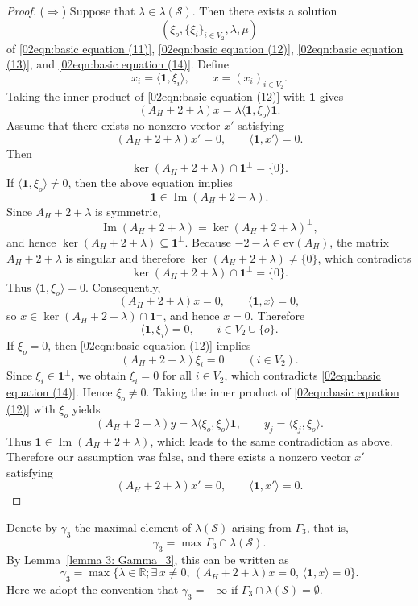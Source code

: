 \documentclass[pdflatex,sn-mathphys-num]{sn-jnl}
\theoremstyle{thmstyleone}%
\theoremstyle{thmstyletwo}%
\theoremstyle{thmstylethree}%
\begin{document}
\begin{proof}
\medskip
\noindent
($\Rightarrow$)
Suppose that $\lambda\in\lambda(\mathcal S)$. Then there exists a solution
\[
(\xi_o,\{\xi_i\}_{i\in V_2},\lambda,\mu)
\]
of \eqref{02eqn:basic equation (11)}, \eqref{02eqn:basic equation (12)}, \eqref{02eqn:basic equation (13)}, and \eqref{02eqn:basic equation (14)}.
Define
\[
x_i=\langle\mathbf{1},\xi_i\rangle,
\qquad
x=(x_i)_{i\in V_2}.
\]
Taking the inner product of \eqref{02eqn:basic equation (12)} with $\mathbf{1}$ gives
\[
(A_H+2+\lambda)x
=
\lambda\langle\mathbf{1},\xi_o\rangle\mathbf{1}.
\]
Assume that there exists no nonzero vector $x'$ satisfying
\[
(A_H+2+\lambda)x' =0,
\qquad
\langle\mathbf{1},x'\rangle=0.
\]
Then
\[
\ker(A_H+2+\lambda)\cap \mathbf{1}^\perp=\{0\}.
\]
If $\langle\mathbf{1},\xi_o\rangle\neq0$, then the above equation implies
\[
\mathbf{1}\in\operatorname{Im}(A_H+2+\lambda).
\]
Since $A_H+2+\lambda$ is symmetric,
\[
\operatorname{Im}(A_H+2+\lambda)
=
\ker(A_H+2+\lambda)^\perp,
\]
and hence $\ker(A_H+2+\lambda)\subseteq\mathbf{1}^\perp$. 
Because $-2-\lambda\in\mathrm{ev}(A_H)$, the matrix $A_H+2+\lambda$ is singular and therefore
$\ker(A_H+2+\lambda)\neq\{0\}$, which contradicts
\[
\ker(A_H+2+\lambda)\cap\mathbf{1}^\perp=\{0\}.
\]
Thus $\langle\mathbf{1},\xi_o\rangle=0$. Consequently,
\[
(A_H+2+\lambda)x=0,
\qquad
\langle\mathbf{1},x\rangle=0,
\]
so $x\in\ker(A_H+2+\lambda)\cap\mathbf{1}^\perp$, and hence $x=0$. Therefore
\[
\langle\mathbf{1},\xi_i\rangle=0,
\qquad i\in V_2\cup\{o\}.
\]
If $\xi_o=0$, then \eqref{02eqn:basic equation (12)} implies
\[
(A_H+2+\lambda)\xi_i=0
\qquad (i\in V_2).
\]
Since $\xi_i\in\mathbf{1}^\perp$, we obtain $\xi_i=0$ for all $i\in V_2$, which contradicts \eqref{02eqn:basic equation (14)}. 
Hence $\xi_o\neq0$. Taking the inner product of \eqref{02eqn:basic equation (12)} with $\xi_o$ yields
\[
(A_H+2+\lambda)y
=
\lambda\langle\xi_o,\xi_o\rangle\mathbf{1},
\qquad
y_j=\langle\xi_j,\xi_o\rangle .
\]
Thus $\mathbf{1}\in\operatorname{Im}(A_H+2+\lambda)$, which leads to the same contradiction as above. Therefore our assumption was false, and there exists a nonzero vector $x'$ satisfying
\[
(A_H+2+\lambda)x'=0,
\qquad
\langle\mathbf{1},x'\rangle=0.
\]
\end{proof}
Denote by $\gamma_3$ the maximal element of $\lambda(\mathcal S)$ arising from $\Gamma_3$, that is,
\[
\gamma_3=\max\Gamma_3\cap \lambda(\mathcal S).
\]
By Lemma~\ref{lemma 3: Gamma_3}, this can be written as
\[
\gamma_3
=\max\{\lambda\in\mathbb{R};
\exists\,x\neq0,\,
(A_H+2+\lambda)x=0,\,
\langle\mathbf{1},x\rangle=0
\}.
\]
Here we adopt the convention that $\gamma_3=-\infty$ if 
$\Gamma_3\cap \lambda(\mathcal S)=\emptyset$.
\end{document}
